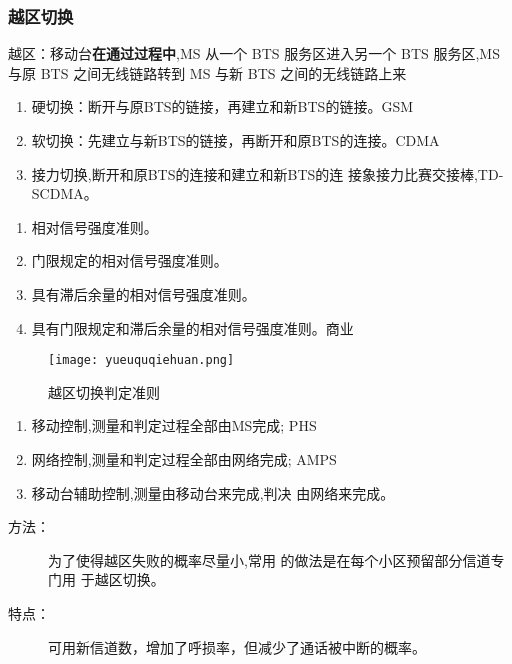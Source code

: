 	\subsubsection{越区切换}
	{越区：移动台\textbf{在通过过程中},MS 从一个 BTS 服务区进入另一个 BTS 服务区,MS 与原 BTS 之间无线链路转到 MS 与新 BTS 之间的无线链路上来}
	\begin{enumerate}
		\item 硬切换：断开与原BTS的链接，再建立和新BTS的链接。GSM
		\item 软切换：先建立与新BTS的链接，再断开和原BTS的连接。CDMA
		\item 接力切换,断开和原BTS的连接和建立和新BTS的连
		接象接力比赛交接棒,TD-SCDMA。
	\end{enumerate}
	\begin{minipage}{0.5\linewidth} 
		\begin{enumerate}
			\item 相对信号强度准则。
			\item 门限规定的相对信号强度准则。
			\item 具有滞后余量的相对信号强度准则。
			\item 具有门限规定和滞后余量的相对信号强度准则。商业
		\end{enumerate}
	\end{minipage}
	\begin{minipage}{0.5\linewidth}
		\begin{figure}[H]
			\centering
			\texttt{[image: yueuquqiehuan.png]}
			\caption{越区切换判定准则}
		\end{figure}
	\end{minipage}
	
	\begin{enumerate}
		\item 移动控制,测量和判定过程全部由MS完成;
		PHS
		\item 网络控制,测量和判定过程全部由网络完成;
		AMPS
		\item 移动台辅助控制,测量由移动台来完成,判决
		由网络来完成。
	\end{enumerate}
	\begin{description}
		\item[方法：] 为了使得越区失败的概率尽量小,常用
		的做法是在每个小区预留部分信道专门用
		于越区切换。
		\item [特点：] 可用新信道数，增加了呼损率，但减少了通话被中断的概率。
	\end{description}

